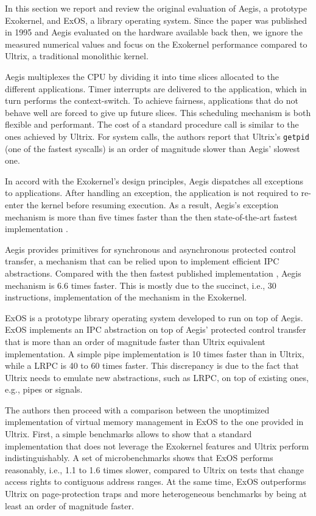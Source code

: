 
In this section we report and review the original evaluation of Aegis, a prototype Exokernel, and ExOS, a library operating system.
Since the paper was published in 1995 and Aegis evaluated on the hardware available back then, we ignore the measured numerical values and focus on the Exokernel performance compared to Ultrix, a traditional monolithic kernel.

Aegis multiplexes the CPU by dividing it into time slices allocated to the different applications.
Timer interrupts are delivered to the application, which in turn performs the context-switch.
To achieve fairness, applications that do not behave well are forced to give up future slices.
This scheduling mechanism is both flexible and performant.
The cost of a standard procedure call is similar to the ones achieved by Ultrix.
For system calls, the authors report that Ultrix's \lstinline{getpid} (one of the fastest syscalls) is an order of magnitude slower than Aegis' slowest one.

In accord with the Exokernel's design principles, Aegis dispatches all exceptions to applications.
After handling an exception, the application is not required to re-enter the kernel before resuming execution.
As a result, Aegis's exception mechanism is more than five times faster than the then state-of-the-art fastest implementation \cite{DBLP:conf/asplos/ThekkathL94}.

Aegis provides primitives for synchronous and asynchronous protected control transfer, a mechanism that can be relied upon to implement efficient IPC abstractions.
Compared with the then fastest published implementation \cite{DBLP:conf/sosp/Liedtke93}, Aegis mechanism is 6.6 times faster.
This is mostly due to the succinct, i.e., 30 instructions, implementation of the mechanism in the Exokernel.

ExOS is a prototype library operating system developed to run on top of Aegis.
ExOS implements an IPC abstraction on top of Aegis' protected control transfer that is more than an order of magnitude faster than Ultrix equivalent implementation.
A simple pipe implementation is 10 times faster than in Ultrix, while a LRPC is 40 to 60 times faster.
This discrepancy is due to the fact that Ultrix needs to emulate new abstractions, such as LRPC, on top of existing ones, e.g., pipes or signals.

The authors then proceed with a comparison between the unoptimized implementation of virtual memory management in ExOS to the one provided in Ultrix.
First, a simple benchmarks allows to show that a standard implementation that does not leverage the Exokernel features and Ultrix perform indistinguishably.
A set of microbenchmarks shows that ExOS performs reasonably, i.e., 1.1 to 1.6 times slower, compared to Ultrix on tests that change access rights to contiguous address ranges.
At the same time, ExOS outperforms Ultrix on page-protection traps and more heterogeneous benchmarks by being at least an order of magnitude faster.